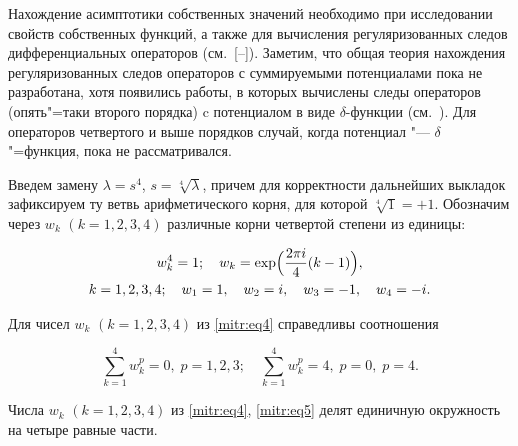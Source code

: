 Нахождение асимптотики собственных значений необходимо при исследовании свойств собственных функций, а также для вычисления регуляризованных следов дифференциальных операторов (см.~[--]). Заметим, что общая теория нахождения регуляризованных следов операторов с суммируемыми потенциалами пока не разработана, хотя  появились работы, в которых вычислены следы операторов (опять"=таки второго порядка) c потенциалом  в виде $\delta$-функции (см.~\cite{mitr:bib14,mitr:bib15}). Для операторов четвертого и выше порядков случай, когда потенциал "--- $\delta$"=функция, пока не рассматривался.



\smallskip




Введем замену $\lambda=s^4$, $s=\sqrt[4]{\lambda}$, причем для корректности дальнейших выкладок зафиксируем ту ветвь арифметического корня, для которой $\sqrt[4]{1}=+1$. Обозначим через $w_k$ $(k=1, 2, 3, 4)$ различные корни четвертой степени из единицы:

\begin{equation}

\label{mitr:eq4}

\begin{gathered}

w^4_k=1; \quad  w_k=\exp\Bigl(\frac{2\pi i}4(k-1)\Bigr), \\

k=1, 2, 3, 4; \quad w_1=1, \quad  w_2=i, \quad w_3=-1, \quad w_4=-i.


\end{gathered}

\end{equation}



Для чисел $w_k$ $(k=1, 2, 3, 4)$ из \eqref{mitr:eq4} справедливы соотношения

\begin{equation}

\label{mitr:eq5}

\sum^4_{k=1}w^p_k=0, \; p=1,2,3; \quad \sum^4_{k=1}w^p_k=4, \; p=0, \; p=4.

\end{equation}



Числа $w_k$ $(k=1, 2, 3, 4)$ из \eqref{mitr:eq4}, \eqref{mitr:eq5} делят единичную окружность на четыре равные части.




